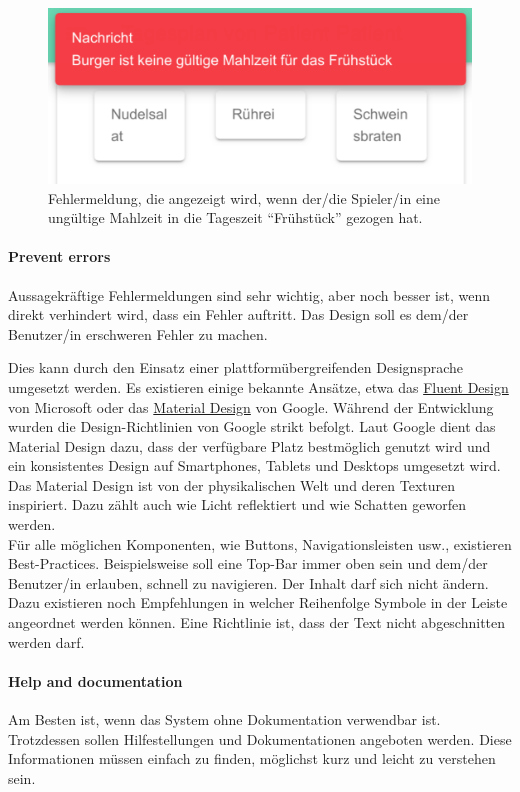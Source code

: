 \begin{figure}[H]
    \centering
	\includegraphics[width=0.5\linewidth]{figures/development/application/error-message.png}
	\caption{Fehlermeldung, die angezeigt wird, wenn der/die Spieler/in eine ungültige Mahlzeit in die Tageszeit \enquote{Frühstück} gezogen hat.}
	\label{fig:game-error-message}
\end{figure}

\paragraph{Prevent errors}
Aussagekräftige Fehlermeldungen sind sehr wichtig, aber noch besser ist, wenn direkt verhindert wird, dass ein Fehler auftritt. Das Design soll es dem/der Benutzer/in erschweren Fehler zu machen. \cite{nielsen:1993:usability}

Dies kann durch den Einsatz einer plattformübergreifenden Designsprache umgesetzt werden. Es existieren einige bekannte Ansätze, etwa das \hyperlink{https://www.microsoft.com/design/fluent/}{Fluent Design} von Microsoft oder das \hyperlink{https://material.io/design/}{Material Design} von Google. Während der Entwicklung wurden die Design-Richtlinien von Google strikt befolgt. 
Laut Google dient das Material Design dazu, dass der verfügbare Platz bestmöglich genutzt wird und ein konsistentes Design auf Smartphones, Tablets und Desktops umgesetzt wird. Das Material Design ist von der physikalischen Welt und deren Texturen inspiriert. Dazu zählt auch wie Licht reflektiert und wie Schatten geworfen werden. \cite{material-design:introduction:2020} \\
Für alle möglichen Komponenten, wie Buttons, Navigationsleisten \acl{usw.}, existieren Best-Practices. Beispielsweise soll eine Top-Bar immer oben sein und dem/der Benutzer/in erlauben, schnell zu navigieren. Der Inhalt darf sich nicht ändern. Dazu existieren noch Empfehlungen in welcher Reihenfolge Symbole in der Leiste angeordnet werden können. Eine Richtlinie ist, dass der Text nicht abgeschnitten werden darf. \cite{material-design:appbar:2020}

\paragraph{Help and documentation}
Am Besten ist, wenn das System ohne Dokumentation verwendbar ist. Trotzdessen sollen Hilfestellungen und Dokumentationen angeboten werden. Diese Informationen müssen einfach zu finden, möglichst kurz und leicht zu verstehen sein. \cite{nielsen:1993:usability}

